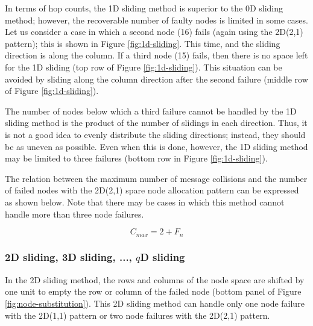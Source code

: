 \documentclass[Afour,times,sagev]{sagej}
\begin{document}
In terms of hop counts, the 1D sliding method is superior to the
0D sliding method; however, the recoverable number of faulty nodes is
limited in some cases. Let us consider a case in which a second node
(16) fails (again using the 2D(2,1) pattern); this is shown in Figure
\ref{fig:1d-sliding}. This time, and the sliding direction is along
the column. If a third node (15) fails, then there is no space left
for the 1D sliding (top row of Figure \ref{fig:1d-sliding}). This
situation can be avoided by sliding along the column direction after
the second failure (middle row of Figure \ref{fig:1d-sliding}).

The number of nodes below which a third failure cannot be handled by
the 1D sliding method is the product of the number of slidings in each
direction. Thus, it is not a good idea to evenly distribute the
sliding directions; instead, they should be as uneven as possible.
Even when this is done, however, the 1D sliding method may be limited
to three failures (bottom row in Figure \ref{fig:1d-sliding}).


The relation between the maximum number of message collisions and the
number of failed nodes with the 2D(2,1) spare node allocation pattern
can be expressed as shown below. Note that there may be cases in which
this method cannot handle more than three node failures.

\[
C_{max} = 2 + F_n
\]

\subsubsection{2D sliding, 3D sliding, ..., $q$D sliding}

In the 2D sliding method, the rows and columns of the node space are
shifted by one unit to empty the row or column of the failed node
(bottom panel of Figure \ref{fig:node-substitution}). This 2D sliding
method can handle only one node failure with the 2D(1,1) pattern or
two node failures with the 2D(2,1) pattern. 
\end{document}
